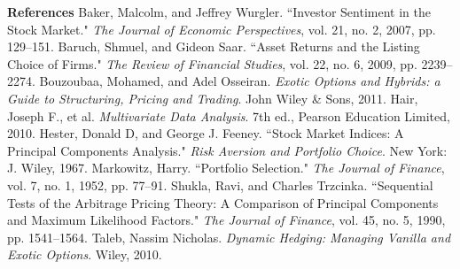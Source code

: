 \documentclass[12pt,twoside]{article}
\begin{document}
{\large \textbf{References}}
\bigbreak
Baker, Malcolm, and Jeffrey Wurgler. ``Investor Sentiment in the Stock Market." \textit{The Journal of Economic Perspectives}, vol. 21, no. 2, 2007, pp. 129–151.
\bigbreak
Baruch, Shmuel, and Gideon Saar. ``Asset Returns and the Listing Choice of Firms." \textit{The Review of Financial Studies}, vol. 22, no. 6, 2009, pp. 2239–2274.
\bigbreak
Bouzoubaa, Mohamed, and Adel Osseiran. \textit{Exotic Options and Hybrids: a Guide to Structuring, Pricing and Trading}. John Wiley \& Sons, 2011.
\bigbreak
Hair, Joseph F., et al. \textit{Multivariate Data Analysis}. 7th ed., Pearson Education Limited, 2010. 
\bigbreak
Hester, Donald D, and George J. Feeney. ``Stock Market Indices: A Principal Components Analysis." \textit{Risk Aversion and Portfolio Choice}. New York: J. Wiley, 1967.
\bigbreak
Markowitz, Harry. ``Portfolio Selection." \textit{The Journal of Finance}, vol. 7, no. 1, 1952, pp. 77–91.
\bigbreak
Shukla, Ravi, and Charles Trzcinka. ``Sequential Tests of the Arbitrage Pricing Theory: A Comparison of Principal Components and Maximum Likelihood Factors." \textit{The Journal of Finance}, vol. 45, no. 5, 1990, pp. 1541–1564.
\bigbreak
Taleb, Nassim Nicholas. \textit{Dynamic Hedging: Managing Vanilla and Exotic Options}. Wiley, 2010.
\end{document}
